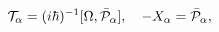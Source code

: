 \begin{equation}\label{6.13}
{\cal T}_\alpha=(i\hbar)^{-1}[\Omega,\bar{\cal P}_\alpha],\quad
-X_\alpha=\bar{\cal P}_\alpha,
\end{equation}

